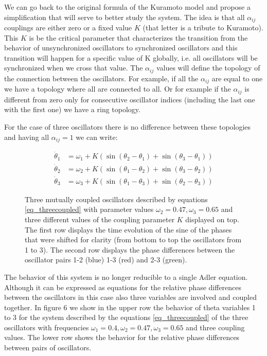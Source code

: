 \documentclass{article}
\begin{document}
We can go back to the original formula of the Kuramoto model and propose a simplification that will serve to better study the system. 
The idea is that all $\alpha_{ij}$ couplings are either zero or a fixed value $K$ (that letter is a tribute to Kuramoto). 
This $K$ is be the critical parameter that characterizes the transition from the behavior of unsynchronized oscillators to synchronized oscillators and this transition will happen for a specific value of K globally, i.e. all oscillators will be synchronized when we cross that value. 
The $\alpha_{ij}$ values will define the topology of the connection between the oscillators. 
For example, if all the $\alpha_{ij}$ are equal to one we have a topology where all are connected to all. 
Or for example if the $\alpha_{ij}$ is different from zero only for consecutive oscillator indices (including the last one with the first one) we have a ring topology.


For the case of three oscillators there is no difference between these topologies and having all $\alpha_{ij}=1$ we can write:

\begin{subequations} \label{eq_threecoupled}
\begin{align}
    \dot{\theta}_1 &= \omega_1 + K \left(\sin(\theta_2 - \theta_1)+\sin(\theta_3 - \theta_1)\right) \\
    \dot{\theta}_2 &= \omega_2 + K \left(\sin(\theta_1 - \theta_2)+\sin(\theta_3 - \theta_2)\right) \\
    \dot{\theta}_3 &= \omega_3 + K \left(\sin(\theta_1 - \theta_3)+\sin(\theta_2 - \theta_3)\right) 
\end{align}
\end{subequations}




\begin{figure} [h]
    \centerline{}
    \caption{Three mutually coupled oscillators described by equations \ref{eq_threecoupled} with parameter values $\omega_2=0.47,\omega_3=0.65$ and three different values of the coupling parameter $K$ displayed on top. The first row displays the time evolution of the sine of the phases that were shifted for clarity (from bottom to top the oscillators from 1 to 3). The second row displays the phase differences between the oscillator pairs 1-2 (blue) 1-3 (red) and 2-3 (green).}
    \label{fig_threecoupled}
\end{figure}

The behavior of this system is no longer reducible to a single Adler equation. 
Although it can be expressed as equations for the relative phase differences between the oscillators in this case also three variables are involved and coupled together. 
In figure 6 we show in the upper row the behavior of theta variables 1 to 3 for the system described by the equations \ref{eq_threecoupled} of the three oscillators with frequencies $\omega_1=0.4,\omega_2=0.47,\omega_3=0.65$ and three coupling values. 
The lower row shows the behavior for the relative phase differences between pairs of oscillators.
\end{document}
